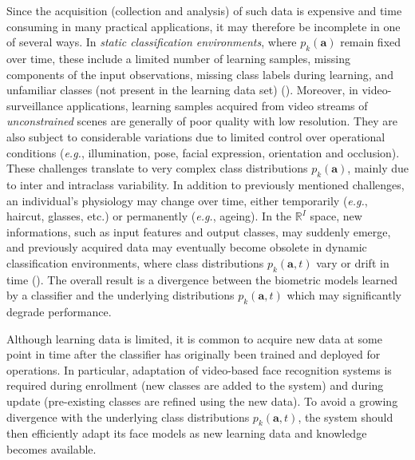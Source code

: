 Since the acquisition (collection and analysis) of such data is expensive and time consuming in many practical applications, it may therefore be incomplete in one of several ways. In \emph{static classification environments}, where $p_k(\textbf{a})$ remain fixed over time, these include a limited number of learning samples, missing components of the input observations, missing class labels during learning, and unfamiliar classes (not present in the learning data set) (\cite{granger01}). Moreover, in video-surveillance applications, learning samples acquired from video streams of \emph{unconstrained} scenes are generally of poor quality with low resolution. They are also subject to considerable variations due to limited control over operational conditions (\emph{e.g.}, illumination, pose, facial expression, orientation and occlusion). These challenges translate to very complex class distributions $p_k(\textbf{a})$, mainly due to inter and intraclass variability. In addition to previously mentioned challenges, an individual's physiology may change over time, either temporarily (\emph{e.g.}, haircut, glasses, etc.) or permanently (\emph{e.g.}, ageing). In the $\mathbb{R}^I$ space, new informations, such as input features and output classes, may suddenly emerge, and previously acquired data may eventually become obsolete in dynamic classification environments, where class distributions $p_k(\textbf{a},t)$ vary or drift in time (\cite{granger01, tsymbal08, widmer96}). The overall result is a divergence between the biometric models learned by a classifier and the underlying distributions $p_k(\textbf{a},t)$ which may significantly degrade performance.

Although learning data is limited, it is common to acquire new data at some point in time after the classifier has originally been trained and deployed for operations. In particular, adaptation of video-based face recognition systems is required during enrollment (new classes are added to the system) and during update (pre-existing classes are refined using the new data). To avoid a growing divergence with the underlying class distributions $p_k(\textbf{a},t)$, the system should then efficiently adapt its face models as new learning data and knowledge becomes available.

